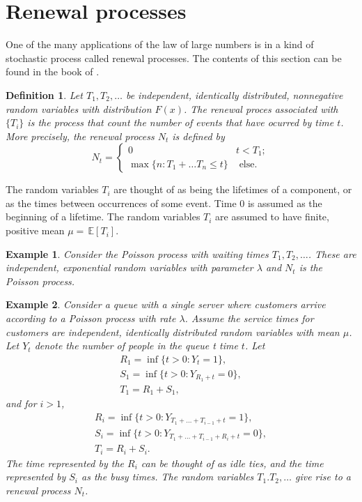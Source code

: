 \documentclass[letterpaper, 10 pt, conference]{article}
\newtheorem{exm}{Example}
\newtheorem{defn}{Definition}
\newcommand\expec[1]{\, \mathbb{E} \left\lbrack #1 \right\rbrack}
\begin{document}
\section{Renewal processes}
One of the many applications of the law of large numbers is in a kind of stochastic process called renewal processes. The contents of this section can be found in the book of \citet{lawler_2006}.

\begin{defn}
	Let $T_1, T_2, \dots$ be independent, identically distributed, nonnegative random variables with distribution $F(x)$. The renewal proces associated with $\lbrace T_i \rbrace$ is the process that count the number of events that have ocurred by time $t$. More precisely, the renewal process $N_t$ is defined by 
	\begin{equation}
		N_t = \begin{cases}
		0 & t < T_1; \\
		\max\lbrace n : T_1 + \dots T_n \leq t\rbrace &  \text{ else.}
		\end{cases}
	\end{equation}
\end{defn}
The random variables $T_i$ are thought of as being the lifetimes of a component, or as the times between occurrences of some event. Time 0 is assumed as the beginning of a lifetime. The random variables $T_i$ are assumed to have finite, positive mean $\mu = \expec{T_i}$.

\begin{exm}\label{exm:poisson}
	Consider the Poisson process with waiting times $T_1, T_2, \dots$. These are independent, exponential random variables with parameter $\lambda$ and $N_t$ is the Poisson process.
\end{exm}

\begin{exm}\label{exm:queue}
Consider a queue with a single server where customers arrive according to a Poisson process with rate $\lambda$. Assume the service times for customers are independent, identically distributed random variables with mean $\mu$. Let $Y_t$ denote the number of people in the queue t time $t$.  Let 
\begin{align}
R_1 = \inf \lbrace t > 0 : Y_t = 1\rbrace, \\
S_1 = \inf\lbrace t > 0 : Y_{R_1 + t} = 0\rbrace, \\
T_1 = R_1 + S_1,
\end{align}
and for $i > 1$,
\begin{align}
R_i = \inf \lbrace t > 0 : Y_{T_1 + \dots + T_{i-1} +t} = 1\rbrace, \\
S_i = \inf\lbrace t > 0 : Y_{T_1 + \dots + T_{i-1} + R_i + t} = 0\rbrace, \\
T_i = R_i + S_i.
\end{align}
The time represented by the $R_i$ can be thought of as idle ties, and the time represented by $S_i$ as the busy times. The random variables $T_1. T_2, \dots$ give rise to a renewal process $N_t$. 
\end{exm}
\end{document}
